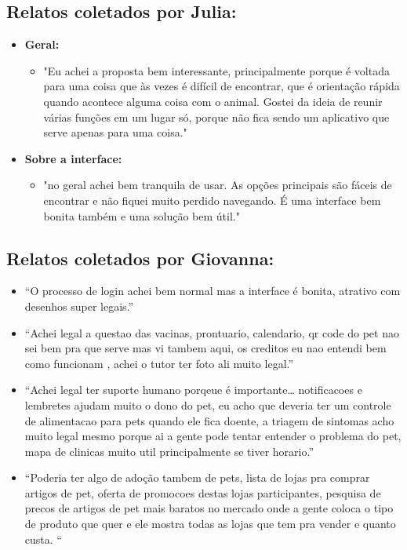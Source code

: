 \subsection{Relatos coletados por Julia:}
\begin{itemize}
\item \textbf{Geral:}

\begin{itemize}
\item "Eu achei a proposta bem interessante, principalmente porque é voltada para uma coisa que às vezes é difícil de encontrar, que é orientação rápida quando acontece alguma coisa com o animal. Gostei da ideia de reunir várias funções em um lugar só, porque não fica sendo um aplicativo que serve apenas para uma coisa."
\end{itemize}
\item \textbf{Sobre a interface:}

\begin{itemize}
\item"no geral achei bem tranquila de usar. As opções principais são fáceis de encontrar e não fiquei muito perdido navegando. É uma interface bem bonita também e uma solução bem útil."
\end{itemize}
\end{itemize}
\subsection{Relatos coletados por Giovanna:}
\begin{itemize}
\item “O processo de login achei bem normal  mas a interface é bonita, atrativo com desenhos super legais.”

\item “Achei legal a questao das vacinas, prontuario, calendario, qr code do pet nao sei bem pra que serve
mas vi tambem aqui, os creditos eu nao entendi bem como funcionam ,
achei o tutor ter foto ali muito legal.”

\item “Achei legal ter suporte humano porqeue é importante…
 notificacoes e lembretes ajudam muito o dono do pet,
eu acho que deveria ter um controle de alimentacao para pets quando ele fica doente,
a triagem de sintomas acho muito legal mesmo porque ai a gente pode tentar entender o problema do pet, mapa de clinicas muito util principalmente se tiver horario.”

\item “Poderia ter algo de adoção tambem de pets,
lista de lojas pra comprar artigos de pet, oferta de promocoes destas lojas participantes,
 pesquisa de precos de artigos de pet mais baratos no mercado onde a gente coloca o tipo de produto que quer e ele mostra todas as lojas que tem pra vender e quanto custa. “

 \end{itemize}


